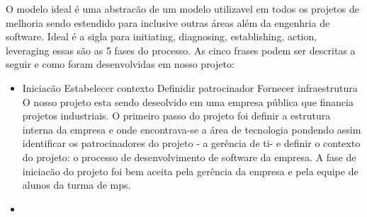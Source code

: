 O modelo ideal é uma abstracão de um modelo utilizavel em todos os projetos
de melhoria sendo estendido para inclusive outras áreas além da engenhria 
de software. Ideal é a sigla para initiating, diagnosing, establishing, action,
leveraging essas são as 5 fases do processo. As cinco frases podem ser 
descritas a seguir e como foram desenvolvidas em nosso projeto:
\begin{itemize}
    \item Iniciacão
        Estabelecer contexto
        Definidir patrocinador
        Fornecer infraestrutura
        O nosso projeto esta sendo deseolvido em uma empresa pública que 
financia projetos industriais. O primeiro passo do projeto foi definir a 
estrutura interna da empresa e onde encontrava-se a área de tecnologia 
pondendo assim identificar os patrocinadores do projeto - a gerência de ti- e
definir o contexto do projeto: o processo de desenvolvimento de software da 
empresa. A fase de iniciacão do projeto foi bem aceita pela gerência da empresa
e pela equipe de alunos da turma de mps.
    \item 
\end{itemize}

